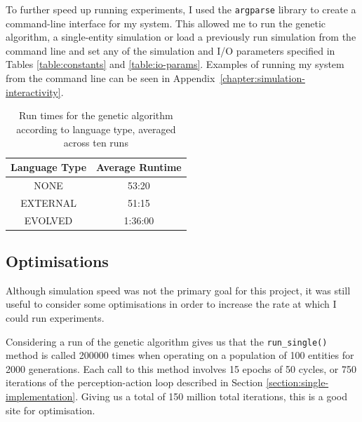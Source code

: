 \documentclass[12pt,a4paper]{report}
\begin{document}
To further speed up running experiments, I used the \texttt{argparse} library to create a command-line interface for my system. This allowed me to run the genetic algorithm, a single-entity simulation or load a previously run simulation from the command line and set any of the simulation and I/O parameters specified in Tables \ref{table:constants} and \ref{table:io-params}. Examples of running my system from the command line can be seen in Appendix~\ref{chapter:simulation-interactivity}.

\begin{table}[t]
\centering
 \begin{tabular}{ c | c}
 \bf{Language Type} & \bf{Average Runtime} \\ [0.5ex] 
 \hline
NONE & 53:20 \\
EXTERNAL & 51:15\\
EVOLVED & 1:36:00 \\
\end{tabular}
\caption{Run times for the genetic algorithm according to language type, averaged across ten runs}
\label{table:runtimes}
\end{table}

\subsection{Optimisations}\label{section:optimisations}

Although simulation speed was not the primary goal for this project, it was still useful to consider some optimisations in order to increase the rate at which I could run experiments.


Considering a run of the genetic algorithm gives us that the \texttt{run\_single()} method is called 200000 times when operating on a population of 100 entities for 2000 generations. Each call to this method involves 15 epochs of 50 cycles, or 750 iterations of the perception-action loop described in Section \ref{section:single-implementation}. Giving us a total of 150 million total iterations, this is a good site for optimisation.
\end{document}
